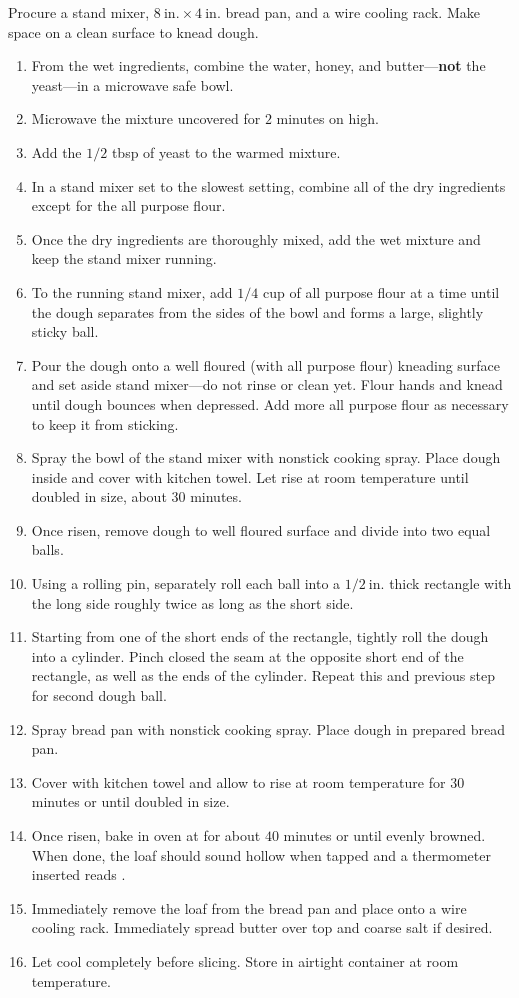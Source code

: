 \instructions
Procure a stand mixer, $8~\mathrm{in.}\times4~\mathrm{in.}$ bread pan, and a wire cooling rack. Make space on a clean surface to knead dough.
\begin{enumerate}
    \item From the wet ingredients, combine the water, honey, and butter---\textbf{not} the yeast---in a microwave safe bowl.
    \item Microwave the mixture uncovered for $2$ minutes on high.\footnotemark[5]
    \item Add the $1/2$ tbsp of yeast to the warmed mixture.
    \item In a stand mixer set to the slowest setting, combine all of the dry ingredients except for the all purpose flour.
    \item Once the dry ingredients are thoroughly mixed, add the wet mixture and keep the stand mixer running.
    \item To the running stand mixer, add $1/4$ cup of all purpose flour at a time until the dough separates from the sides of the bowl and forms a large, slightly sticky ball.
    \item Pour the dough onto a well floured (with all purpose flour) kneading surface and set aside stand mixer---do not rinse or clean yet. Flour hands and knead until dough bounces when depressed. Add more all purpose flour as necessary to keep it from sticking.
    \item Spray the bowl of the stand mixer with nonstick cooking spray. Place dough inside and cover with kitchen towel. Let rise at room temperature until doubled in size, about $30$ minutes.
    \item Once risen, remove dough to well floured surface and divide into two equal balls.
    \item Using a rolling pin, separately roll each ball into a $1/2~\mathrm{in.}$ thick rectangle with the long side roughly twice as long as the short side.
    \item Starting from one of the short ends of the rectangle, tightly roll the dough into a cylinder. Pinch closed the seam at the opposite short end of the rectangle, as well as the ends of the cylinder. Repeat this and previous step for second dough ball.\footnotemark[6]
    \item Spray bread pan with nonstick cooking spray. Place dough in prepared bread pan.
    \item Cover with kitchen towel and allow to rise at room temperature for $30$ minutes or until doubled in size.
    \item Once risen, bake in oven at  for about $40$ minutes or until evenly browned. When done, the loaf should sound hollow when tapped and a thermometer inserted reads .
    \item Immediately remove the loaf from the bread pan and place onto a wire cooling rack. Immediately spread butter over top and coarse salt if desired.
    \item Let cool completely before slicing. Store in airtight container at room temperature.
\end{enumerate}
